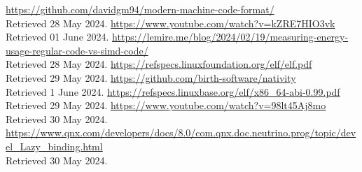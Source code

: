 \documentclass[12pt]{article}
\begin{document}
	\begin{thebibliography}{9}
		 \href{https://github.com/davidgm94/modern-machine-code-format/}{https://github.com/davidgm94/modern-machine-code-format/}\\
		Retrieved 28 May 2024.
		\href{https://www.youtube.com/watch?v=kZRE7HIO3vk}{https://www.youtube.com/watch?v=kZRE7HIO3vk}\\
		Retrieved 01 June 2024.
		\href{https://lemire.me/blog/2024/02/19/measuring-energy-usage-regular-code-vs-simd-code}{https://lemire.me/blog/2024/02/19/measuring-energy-usage-regular-code-vs-simd-code/}\\
		Retrieved 28 May 2024.
		\href{https://refspecs.linuxfoundation.org/elf/elf.pdf}{https://refspecs.linuxfoundation.org/elf/elf.pdf}\\
		Retrieved 29 May 2024.
		\href{https://github.com/birth-software/nativity}{https://github.com/birth-software/nativity}\\
		Retrieved 1 June 2024.
		\href{https://refspecs.linuxbase.org/elf/x86_64-abi-0.99.pdf}{https://refspecs.linuxbase.org/elf/x86\_64-abi-0.99.pdf}\\
		Retrieved 29 May 2024.
		\href{https://www.youtube.com/watch?v=98lt45Aj8mo}{https://www.youtube.com/watch?v=98lt45Aj8mo}\\
		Retrieved 30 May 2024.
		\href{https://www.qnx.com/developers/docs/8.0/com.qnx.doc.neutrino.prog/topic/devel_Lazy_binding.html}{https://www.qnx.com/developers/docs/8.0/com.qnx.doc.neutrino.prog/topic/devel\_Lazy\_binding.html}\\
		Retrieved 30 May 2024.
	\end{thebibliography}

\end{document}
